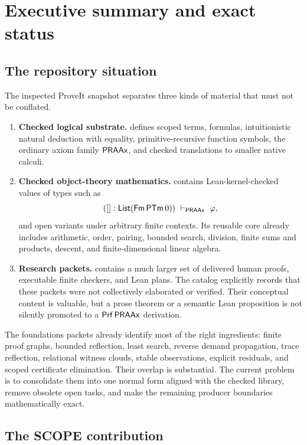 \section{Executive summary and exact status}

\subsection{The repository situation}

The inspected ProveIt snapshot separates three kinds of material that must not be conflated.

\begin{enumerate}
\item \textbf{Checked logical substrate.}   defines scoped terms, formulas, intuitionistic natural deduction with equality, primitive-recursive function symbols, the ordinary axiom family \(\mathsf{PRAAx}\), and checked translations to smaller native calculi.
\item \textbf{Checked object-theory mathematics.}   contains Lean-kernel-checked values of types such as
\[
  ([] : \mathsf{List}(\Fm\,\PTm\,0))\ \vdash_{\PRAAx}\ \varphi,
\]
and open variants under arbitrary finite contexts.  Its reusable core already includes arithmetic, order, pairing, bounded search, division, finite sums and products, descent, and finite-dimensional linear algebra.
\item \textbf{Research packets.}   contains a much larger set of delivered human proofs, executable finite checkers, and Lean plans.  The catalog explicitly records that these packets were not collectively elaborated or verified.  Their conceptual content is valuable, but a prose theorem or a semantic Lean proposition is not silently promoted to a \(\mathsf{Prf}\,\mathsf{PRAAx}\) derivation.
\end{enumerate}

The foundations packets already identify most of the right ingredients: finite proof graphs, bounded reflection, least search, reverse demand propagation, trace reflection, relational witness clouds, stable observations, explicit residuals, and scoped certificate elimination.  Their overlap is substantial.  The current problem is to consolidate them into one normal form aligned with the checked library, remove obsolete open tasks, and make the remaining producer boundaries mathematically exact.

\subsection{The SCOPE contribution}

